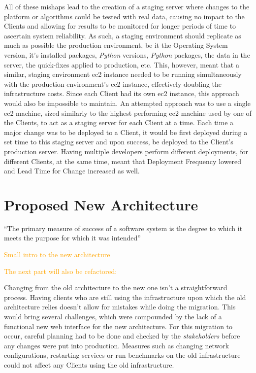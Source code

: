 All of these mishaps lead to the creation of a staging server where changes to the platform or algorithms could be tested with real data, causing no impact to the Clients and allowing for results to be monitored for longer periods of time to ascertain system reliability. As such, a staging environment should replicate as much as possible the production environment, be it the Operating System version, it's installed packages, \textit{Python} versions, \textit{Python} packages, the data in the server, the quick-fixes applied to production, etc.
This, however, meant that a similar, staging environment \gls{ec2} instance needed to be running simultaneously with the production environment's \gls{ec2} instance, effectively doubling the infrastructure costs. Since each Client had its own \gls{ec2} instance, this approach would also be impossible to maintain. An attempted approach was to use a single \gls{ec2} machine, sized similarly to the highest performing \gls{ec2} machine used by one of the Clients, to act as a staging server for each Client at a time. Each time a major change was to be deployed to a Client, it would be first deployed during a set time to this staging server and upon success, be deployed to the Client's production server. Having multiple developers perform different deployments, for different Clients, at the same time, meant that Deployment Frequency lowered and Lead Time for Change increased as well.


\section{Proposed New Architecture}\label{methodology:s:proposed-new-architecture}

``The primary measure of success of a software system is the
degree to which it meets the purpose for which it was
intended''

\textcolor{orange}{Small intro to the new architecture}

\textcolor{orange}{The next part will also be refactored:}

Changing from the old architecture to the new one isn't a straightforward process. Having clients who are still using the infrastructure upon which the old architecture relies doesn't allow for mistakes while doing the migration. This would bring several challenges, which were compounded by the lack of a functional new web interface for the new architecture. For this migration to occur, careful planning had to be done and checked by the \textit{stakeholders} before any changes were put into production. Measures such as changing network configurations, restarting services or run benchmarks on the old infrastructure could not affect any Clients using the old infrastructure.


